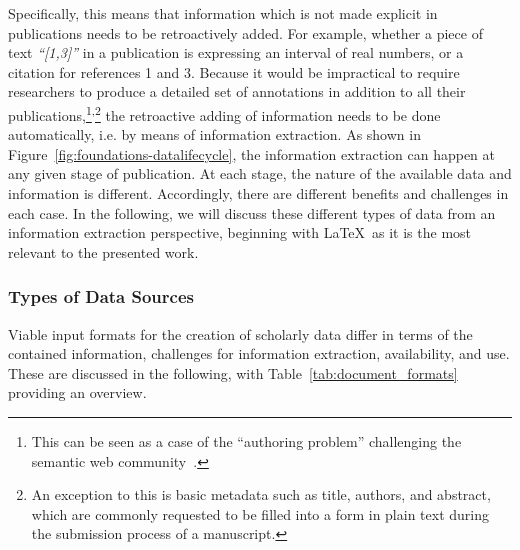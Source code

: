 Specifically, this means that information which is not made explicit in publications needs to be retroactively added. For example, whether a piece of text \textit{``[1,3]''} in a publication is expressing an interval of real numbers, or a citation for references 1 and 3. Because it would be impractical to require researchers to produce a detailed set of annotations in addition to all their publications,\footnote{This can be seen as a case of the ``authoring problem'' challenging the semantic web community~\cite{Kohlhase2010}.}\textsuperscript{,}\footnote{An exception to this is basic metadata such as title, authors, and abstract, which are commonly requested to be filled into a form in plain text during the submission process of a manuscript.} the retroactive adding of information needs to be done automatically, i.e. by means of information extraction. As shown in Figure~\ref{fig:foundations-datalifecycle}, the information extraction can happen at any given stage of publication. At each stage, the nature of the available data and information is different. Accordingly, there are different benefits and challenges in each case. In the following, we will discuss these different types of data from an information extraction perspective, beginning with \LaTeX\ as it is the most relevant to the presented work.

\subsubsection{Types of Data Sources}

Viable input formats for the creation of scholarly data differ in terms of the contained information, challenges for information extraction, availability, and use.
These are discussed in the following, with Table~\ref{tab:document_formats} providing an overview.

